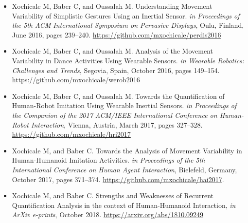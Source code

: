 \begin{itemize}
\item Xochicale M, Baber C, and Oussalah M. 
	Understanding Movement Variability of Simplistic Gestures Using 
	an Inertial Sensor. 
	\textit{in Proceedings of the 5th ACM International 
	Symposium on Pervasive Displays}, 
	Oulu, Finland, June 2016, 
	pages 239--240.
	\url{https://github.com/mxochicale/perdis2016}

\item Xochicale M, Baber C, and Oussalah M.
	Analysis of the Movement Variability in Dance Activities Using 
	Wearable Sensors.
	\textit{in Wearable Robotics: Challenges and Trends},
	Segovia, Spain, October 2016,
	pages 149--154. \\
	\url{https://github.com/mxochicale/werob2016}

\item Xochicale M, Baber C, and Oussalah M.
	Towards the Quantification of Human-Robot Imitation Using Wearable 
	Inertial Sensors.
	\textit{in Proceedings of the Companion of the 2017 
	ACM/IEEE International Conference on Human-Robot Interaction},
	Vienna, Austria, March 2017,
	pages 327--328. \\
	\url{https://github.com/mxochicale/hri2017}

\item Xochicale M, and Baber C.
	Towards the Analysis of Movement Variability in Human-Humanoid 
	Imitation Activities.
	\textit{in Proceedings of the 5th International 
	Conference on Human Agent Interaction},
	Bielefeld, Germany, October 2017,
	pages 371--374.
	\url{https://github.com/mxochicale/hai2017}.

\item Xochicale M, and Baber C.
	Strengths and Weaknesses of Recurrent Quantification Analysis in 
	the context of Human-Humanoid Interaction,
	\textit{in ArXiv e-prints}, 
	October 2018.
	\url{https://arxiv.org/abs/1810.09249}


\end{itemize}


